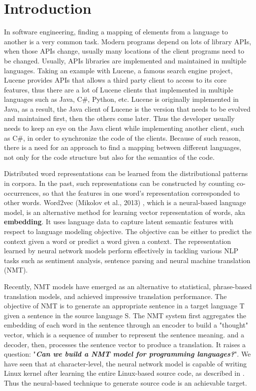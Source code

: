 \section{Introduction}

In software engineering, finding a mapping of elements from a language to another is a very common task. Modern programs depend on lots of library APIs, when those APIs change, usually many locations of the client programs need to be changed. Usually, APIs libraries are implemented and maintained in multiple languages. Taking an example with Lucene, a famous search engine project, Lucene provides APIs that allows a third party client to access to its core features, thus there are a lot of Lucene clients that implemented in multiple languages such as Java, C\#, Python, etc. Lucene is originally implemented in Java, as a result, the Java client of Lucene is the version that needs to be evolved and maintained first, then the others come later. Thus the developer usually needs to keep an eye on the Java client while implementing another client, such as C\#, in order to synchronize the code of the clients. Because of such reason, there is a need for an approach to find a mapping between different languages, not only for the code structure but also for the semantics of the code.

Distributed word representations can be learned from the distributional patterns in corpora. In the past, such representations can be constructed by counting co-occurrences, so that the features in one word's representation corresponded to other words. Word2vec (Mikolov et al., 2013) \cite{mikolov2013distributed}, which is a neural-based language model, is an alternative method for learning vector representation of words, aka \textbf{embedding}. It uses language data to capture latent semantic features with respect to language modeling objective. The objective can be either to predict the context given a word or predict a word given a context. The representation learned by neural network models perform effectively in tackling various NLP tasks such as sentiment analysis, sentence parsing and neural machine translation (NMT).

Recently, NMT models have emerged as an alternative to statistical, phrase-based translation models, and achieved impressive translation performance. The objective of NMT is to generate an appropriate sentence in a target language T given a sentence in the source language S. The NMT system first aggregates the embedding of each word in the sentence through an encoder to build a "thought" vector, which is a sequence of number to represent the sentence meaning. and a decoder, then, processes the sentence vector to produce a translation. It raises a question: "\textbf{\textit{Can we build a NMT model for programming languages?}}". We have seen that at character-level, the neural network model is capable of writing Linux kernel after learning the entire Linux-based source code, as described in \cite{Karpathy}. Thus the neural-based technique to generate source code is an achievable target.

